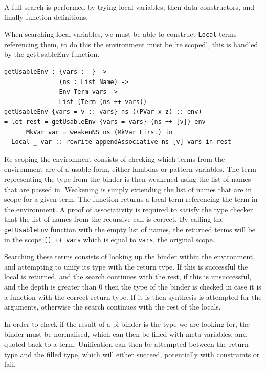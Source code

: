 \documentclass[a4paper]{article}
\begin{document}
A full search is performed by trying local variables, then data constructors,
and finally function definitions. 

When searching local variables, we must be able to construct \texttt{Local} terms
referencing them, to do this the environment must be `re scoped', this is handled by the
getUsableEnv function.

\begin{center}
  \begin{verbatim}
getUsableEnv : {vars : _} -> 
               (ns : List Name) ->
               Env Term vars ->
               List (Term (ns ++ vars))
getUsableEnv {vars = v :: vars} ns ((PVar x z) :: env) 
= let rest = getUsableEnv {vars = vars} (ns ++ [v]) env 
      MkVar var = weakenNS ns (MkVar First) in 
  Local _ var :: rewrite appendAssociative ns [v] vars in rest
  \end{verbatim}
\end{center}

Re-scoping the environment consists of checking which terms from the 
environment are of a usable form, either lambdas or pattern variables.
The term representing the type from the binder is then weakened using the list of names that are passed in.
Weakening is simply extending the list of names that are in scope for
a given term. The function returns a local term referencing the term in the environment. A
proof of associativity is required to satisfy the type checker that
the list of names from the recursive call is correct. By calling
the \texttt{getUsableEnv} function with the empty list of names, the returned
terms will be in the scope \texttt{[] ++ vars} which is equal to
\texttt{vars}, the original scope.

Searching these terms consists of looking up the binder within the
environment, and attempting to unify its type with the return type.
If this is successful the local is returned, and the search continues
with the rest, if this is unsuccessful, and the depth is greater than
0 then the type of the binder is checked in case it is a function with
the correct return type. If it is then synthesis is attempted for the arguments,
otherwise the search continues with the rest of the locals.

In order to check if the result of a pi binder is the type we are
looking for, the binder must be normalised, which can then be filled
with meta-variables, and quoted back to a term. Unification can then be
attempted between the return type and the filled type, which will
either succeed, potentially with constraints or fail.
\end{document}
